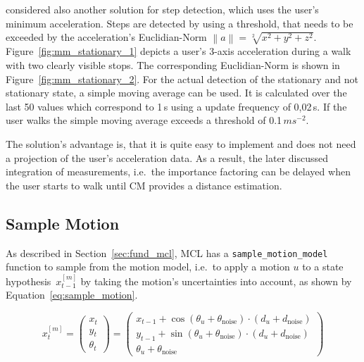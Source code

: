\citet{shanklin:embedded_sensors} considered also another solution for step detection, which uses the user's minimum acceleration. Steps are detected by using a threshold, that needs to be exceeded by the acceleration's Euclidian-Norm $\left\lVert a \right\rVert = \sqrt[2]{x^{2}+y^{2}+z^{2}}$. Figure~\ref{fig:mm_stationary_1} depicts a user's 3-axis acceleration during a walk with two clearly visible stops. The corresponding Euclidian-Norm is shown in Figure~\ref{fig:mm_stationary_2}. For the actual detection of the stationary and not stationary state, a simple moving average can be used. It is calculated over the last 50 values which correspond to 1\,s using a update frequency of 0,02\,s. If the user walks the simple moving average exceeds a threshold of 0.1\,$ms^{-2}$.

The solution's advantage is, that it is quite easy to implement and does not need a projection of the user's acceleration data. As a result, the later discussed integration of measurements, i.e.\ the importance factoring can be delayed when the user starts to walk until \acs{CM} provides a distance estimation.
 


\subsection{Sample Motion}\label{sec:algo_sample_motion}
As described in Section~\ref{sec:fund_mcl}, \acs{MCL} has a \texttt{sample\_motion\_model} function to sample from the motion model, i.e.\ to apply a motion $u$ to a state hypothesis~$x^{[m]}_{t-1}$ by taking the motion's uncertainties into account, as shown by Equation~\ref{eq:sample_motion}.

\begin{equation}\label{eq:sample_motion}
	x^{[m]}_t = \left(
    \begin{array}{c}
      x_t\\
      y_t\\
      \theta_t
    \end{array}
  \right) = \left(\begin{array}{c} x_{t-1} + \cos(\theta_u + \theta_{\text{noise}})\cdot (d_u + d_\text{noise}) \\ y_{t-1} + \sin(\theta_u + \theta_{\text{noise}})\cdot (d_u + d_\text{noise}) \\ \theta_u + \theta_{\text{noise}}
    \end{array}
  \right)
\end{equation}

